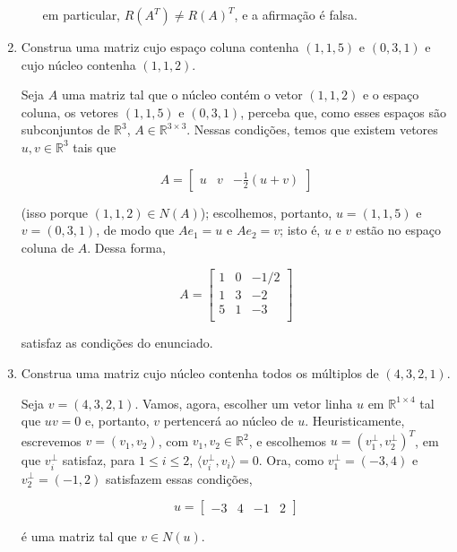\documentclass[leqno]{article}
\begin{document}
\begin{enumerate}
\begin{enumerate}
\begin{sol}
		\noindent em particular, $R(A^{T}) \neq R(A)^{T}$, e a afirmação é falsa.  
	    \end{sol} 
        \end{enumerate}

    \item Construa uma matriz cujo espaço coluna contenha $(1,1,5)$ e $(0,3,1)$ e cujo núcleo contenha $(1,1,2)$.

    \begin{sol} 
    	Seja $A$ uma matriz tal que o núcleo contém o vetor $(1, 1, 2)$ e o espaço coluna, os vetores $(1, 1, 5)$ e $(0, 3, 1)$, perceba que, como esses espaços são subconjuntos de $\mathbb{R}^{3}$, $A \in \mathbb{R}^{3 \times 3}$. Nessas condições, temos que existem vetores $u, v \in \mathbb{R}^{3}$ tais que 

	\begin{equation*} 
		A = 
		\begin{bmatrix} 
			u & v & -\frac{1}{2} (u + v)    
		\end{bmatrix} 
	\end{equation*} 

	\noindent (isso porque $(1, 1, 2) \in N(A)$); escolhemos, portanto, $u = (1, 1, 5)$ e $v = (0, 3, 1)$, de modo que $Ae_{1} = u$ e $Ae_{2} = v$; isto é, $u$ e $v$ estão no espaço coluna de $A$. Dessa forma, 

	\begin{equation*} 
		A = 
		\begin{bmatrix} 
			1 & 0 & -1/2 \\ 
			1 & 3 & -2 \\ 
			5 & 1 & -3 \\ 
		\end{bmatrix} 
	\end{equation*} 

	\noindent satisfaz as condições do enunciado.  
    \end{sol} 

    \item Construa uma matriz cujo núcleo contenha todos os múltiplos de $(4,3,2,1)$.
    
    \begin{sol} 
	    Seja $v = (4, 3, 2, 1)$. Vamos, agora, escolher um vetor linha $u$ em $\mathbb{R}^{1 \times 4}$ tal que $uv = 0$ e, portanto, $v$ pertencerá ao núcleo de $u$. Heuristicamente, escrevemos $v = (v_{1}, v_{2})$, com $v_{1}, v_{2} \in \mathbb{R}^{2}$, e escolhemos $u = (v_{1}^{\perp}, v_{2}^{\perp})^{T}$, em que $v_{i}^{\perp}$ satisfaz, para $1 \le i \le 2$, $\langle v_{i}^{\perp}, v_{i} \rangle = 0$. Ora, como $v_{1}^{\perp} = (-3, 4)$ e $v_{2}^{\perp} = (-1, 2)$ satisfazem essas condições, 

	    \begin{equation*} 
		    u = 
		    \begin{bmatrix} 
			    -3 & 4 & -1 & 2    
		    \end{bmatrix} 
	    \end{equation*} 

	    \noindent é uma matriz tal que $v \in N(u)$. 
    \end{sol} 
\end{enumerate} 

 
 
\end{document}
